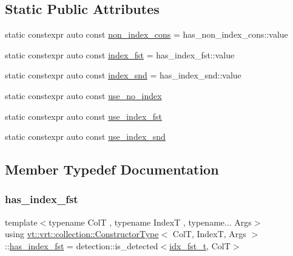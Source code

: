 \subsection*{Static Public Attributes}
\begin{DoxyCompactItemize}
\item 
static constexpr auto const \hyperlink{structvt_1_1vrt_1_1collection_1_1_constructor_type_a84ceed8f579b40d34fe1cd69d654227d}{non\+\_\+index\+\_\+cons} = has\+\_\+non\+\_\+index\+\_\+cons\+::value
\item 
static constexpr auto const \hyperlink{structvt_1_1vrt_1_1collection_1_1_constructor_type_a7ce20228ab2e310eb2e5217652af1741}{index\+\_\+fst} = has\+\_\+index\+\_\+fst\+::value
\item 
static constexpr auto const \hyperlink{structvt_1_1vrt_1_1collection_1_1_constructor_type_a8dc80a798ad30e23016abddd56077be5}{index\+\_\+snd} = has\+\_\+index\+\_\+snd\+::value
\item 
static constexpr auto const \hyperlink{structvt_1_1vrt_1_1collection_1_1_constructor_type_af87163cdd43c8ef39edcaf894c9d6386}{use\+\_\+no\+\_\+index}
\item 
static constexpr auto const \hyperlink{structvt_1_1vrt_1_1collection_1_1_constructor_type_ac1ee75d4c1b2cd2c5b89296358460fea}{use\+\_\+index\+\_\+fst}
\item 
static constexpr auto const \hyperlink{structvt_1_1vrt_1_1collection_1_1_constructor_type_aa9078dbcceaf5bb8a04966d07b0e2b71}{use\+\_\+index\+\_\+snd}
\end{DoxyCompactItemize}


\subsection{Member Typedef Documentation}
\mbox{\label{structvt_1_1vrt_1_1collection_1_1_constructor_type_a5a20a957219744988e26784279ad5783}} 
\subsubsection{\texorpdfstring{has\+\_\+index\+\_\+fst}{has\_index\_fst}}
{\footnotesize\ttfamily template$<$typename ColT , typename IndexT , typename... Args$>$ \\
using \hyperlink{structvt_1_1vrt_1_1collection_1_1_constructor_type}{vt\+::vrt\+::collection\+::\+Constructor\+Type}$<$ ColT, IndexT, Args $>$\+::\hyperlink{structvt_1_1vrt_1_1collection_1_1_constructor_type_a5a20a957219744988e26784279ad5783}{has\+\_\+index\+\_\+fst} =  detection\+::is\+\_\+detected$<$\hyperlink{structvt_1_1vrt_1_1collection_1_1_constructor_type_a1c790c5cce774596e5027eb02fe2e1ca}{idx\+\_\+fst\+\_\+t}, ColT$>$}

